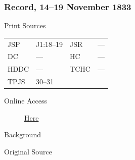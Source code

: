 		\subsubsection{Record, 14--19 November 1833}
			\label{EMS-1833-JS-14-19-NOV-1833}
		
			\begin{description}
				\item[Print Sources]
			\end{description}

				\begin{tabular}{p{0.5in}p{1in}p{0.5in}p{1in}}
				JSP	 	& J1:18--19	& JSR 		& --- \\
				DC	 	& ---	& HC 		& --- \\
				HDDC 	& ---	& TCHC 		& --- \\
				TPJS 	& 30--31 &  &  \\
				\end{tabular}
			
			\begin{description}
				\item[Online Access] \href{https://www.josephsmithpapers.org/paper-summary/journal-1832-1834/21}{Here}
			\end{description}
			
			\begin{description}
				\item[Background]
			\end{description}
			
			
			\begin{description}
				\item[Original Source]
			\end{description}
			
			
